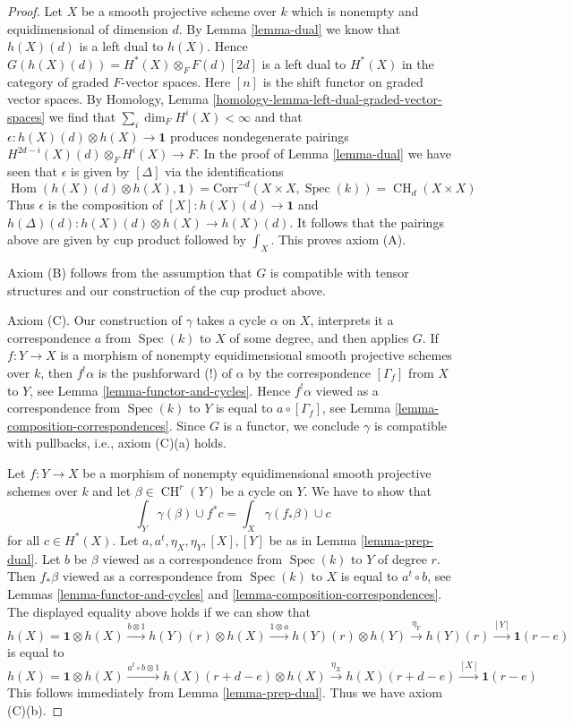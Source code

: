 \documentclass{stacks-project}
\theoremstyle{plain}
\theoremstyle{definition}
\theoremstyle{remark}
\numberwithin{equation}{subsection}
\def\Spec{\mathop{\mathrm{Spec}}}
\def\Hom{\mathop{\mathrm{Hom}}\nolimits}
\def\CH{\mathop{\mathrm{CH}}\nolimits}
\begin{document}
\begin{proof}
\medskip\noindent
Let $X$ be a smooth projective scheme over $k$ which is
nonempty and equidimensional of dimension $d$. By Lemma \ref{lemma-dual}
we know that $h(X)(d)$ is a left dual to $h(X)$. Hence
$G(h(X)(d)) = H^*(X) \otimes_F F(d)[2d]$
is a left dual to $H^*(X)$ in the category of graded $F$-vector spaces.
Here $[n]$ is the shift functor on graded vector spaces.
By Homology, Lemma \ref{homology-lemma-left-dual-graded-vector-spaces}
we find that $\sum_i \dim_F H^i(X) < \infty$ and that
$\epsilon : h(X)(d) \otimes h(X) \to \mathbf{1}$ produces
nondegenerate pairings $H^{2d - i}(X)(d) \otimes_F H^i(X) \to F$.
In the proof of Lemma \ref{lemma-dual} we have seen that
$\epsilon$ is given by $[\Delta]$ via the identifications
$$
\Hom(h(X)(d) \otimes h(X), \mathbf{1}) =
\text{Corr}^{-d}(X \times X, \Spec(k)) =
\CH_d(X \times X)
$$
Thus $\epsilon$ is the composition of $[X] : h(X)(d) \to \mathbf{1}$
and $h(\Delta)(d) : h(X)(d) \otimes h(X) \to h(X)(d)$. It follows
that the pairings above are given by cup product followed by
$\int_X$. This proves axiom (A).

\medskip\noindent
Axiom (B) follows from the assumption that $G$ is compatible
with tensor structures and our construction of the cup product above.

\medskip\noindent
Axiom (C). Our construction of $\gamma$ takes a cycle $\alpha$ on $X$,
interprets it a correspondence $a$ from $\Spec(k)$ to $X$ of some degree,
and then applies $G$. If $f : Y \to X$ is a morphism of nonempty
equidimensional smooth projective schemes over $k$, then
$f^!\alpha$ is the pushforward (!) of $\alpha$
by the correspondence $[\Gamma_f]$ from $X$ to $Y$, see
Lemma \ref{lemma-functor-and-cycles}. Hence
$f^!\alpha$ viewed as a correspondence from $\Spec(k)$ to $Y$
is equal to $a \circ [\Gamma_f]$, see
Lemma \ref{lemma-composition-correspondences}.
Since $G$ is a functor, we conclude
$\gamma$ is compatible with pullbacks, i.e., axiom (C)(a) holds.

\medskip\noindent
Let $f : Y \to X$ be a morphism of nonempty equidimensional
smooth projective schemes over $k$ and
let $\beta \in \CH^r(Y)$ be a cycle on $Y$. We have to show that
$$
\int_Y \gamma(\beta) \cup f^*c = \int_X \gamma(f_*\beta) \cup c
$$
for all $c \in H^*(X)$. Let $a, a^t, \eta_X, \eta_Y, [X], [Y]$
be as in Lemma \ref{lemma-prep-dual}.
Let $b$ be $\beta$ viewed as a correspondence from $\Spec(k)$ to $Y$
of degree $r$. Then $f_*\beta$ viewed as a correspondence from
$\Spec(k)$ to $X$ is equal to $a^t \circ b$, see
Lemmas \ref{lemma-functor-and-cycles} and
\ref{lemma-composition-correspondences}.
The displayed equality above holds if we can show that
$$
h(X) = \mathbf{1} \otimes h(X)
\xrightarrow{b \otimes 1}
h(Y)(r) \otimes h(X)
\xrightarrow{1 \otimes a}
h(Y)(r) \otimes h(Y)
\xrightarrow{\eta_Y}
h(Y)(r)
\xrightarrow{[Y]}
\mathbf{1}(r - e)
$$
is equal to
$$
h(X) = \mathbf{1} \otimes h(X)
\xrightarrow{a^t \circ b \otimes 1}
h(X)(r + d - e) \otimes h(X)
\xrightarrow{\eta_X}
h(X)(r + d - e)
\xrightarrow{[X]}
\mathbf{1}(r - e)
$$
This follows immediately from Lemma \ref{lemma-prep-dual}.
Thus we have axiom (C)(b).


\end{proof}
\end{document}
